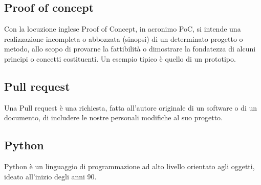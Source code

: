 \subsection*{Proof of concept}
Con la locuzione inglese Proof of Concept, in acronimo PoC, si intende una realizzazione incompleta o abbozzata (sinopsi) di un determinato progetto o metodo, allo scopo di provarne la fattibilità o dimostrare la fondatezza di alcuni principi o concetti costituenti. Un esempio tipico è quello di un prototipo.

\subsection*{Pull request}
Una Pull request è una richiesta, fatta all’autore originale di un software o di un documento, di includere le nostre personali modifiche al suo progetto.

\subsection*{Python}
Python è un linguaggio di programmazione ad alto livello orientato agli oggetti, ideato all'inizio degli anni 90.


